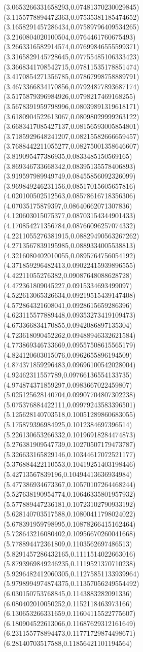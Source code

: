 {(3.0653266331658293,0.07481370230029845)
(3.1155778894472363,0.07535381185474652)
(3.1658291457286434,0.07589796409534265)
(3.2160804020100504,0.0764461760675493)
(3.2663316582914574,0.07699846555599371)
(3.3165829145728645,0.07755485106333423)
(3.3668341708542715,0.07811535178851474)
(3.4170854271356785,0.07867998758889791)
(3.4673366834170856,0.07924877893687174)
(3.5175879396984926,0.0798217469168255)
(3.5678391959798996,0.08039891319618171)
(3.6180904522613067,0.08098029999263122)
(3.6683417085427137,0.08156593005854801)
(3.7185929648241207,0.08215582666659457)
(3.7688442211055277,0.08275001358646607)
(3.819095477386935,0.0833485150569165)
(3.869346733668342,0.08395135578406893)
(3.919597989949749,0.08455856092326099)
(3.969849246231156,0.08517015605657816)
(4.020100502512563,0.08578616718356306)
(4.07035175879397,0.08640662071307836)
(4.120603015075377,0.08703154344901433)
(4.170854271356784,0.08766096257074332)
(4.2211055276381915,0.08829490563267262)
(4.2713567839195985,0.0889334005538813)
(4.3216080402010055,0.0895764756054192)
(4.371859296482413,0.09022415939896555)
(4.42211055276382,0.09087648088628728)
(4.472361809045227,0.0915334693499097)
(4.522613065326634,0.09219515439147408)
(4.572864321608041,0.0928615659286396)
(4.623115577889448,0.09353273419109473)
(4.673366834170855,0.0942086897135304)
(4.723618090452262,0.09488946332621584)
(4.773869346733669,0.09557508615565179)
(4.824120603015076,0.0962655896194509)
(4.874371859296483,0.09696100542028004)
(4.92462311557789,0.09766136554133735)
(4.974874371859297,0.0983667022459807)
(5.025125628140704,0.09907704807302238)
(5.075376884422111,0.09979243583396501)
(5.125628140703518,0.10051289860683055)
(5.175879396984925,0.1012384697396514)
(5.226130653266332,0.10196918284474873)
(5.276381909547739,0.10270507179473787)
(5.326633165829146,0.10344617072521177)
(5.376884422110553,0.10419251403198446)
(5.42713567839196,0.10494413636934984)
(5.477386934673367,0.10570107264468244)
(5.527638190954774,0.10646335801957932)
(5.577889447236181,0.10723102790933192)
(5.628140703517588,0.10800411798024022)
(5.678391959798995,0.10878266415162464)
(5.728643216080402,0.10956670260041668)
(5.778894472361809,0.1103562697486513)
(5.8291457286432165,0.1111514022663016)
(5.8793969849246235,0.1119521370710238)
(5.9296482412060305,0.11275851133939964)
(5.9798994974874375,0.11357056249554492)
(6.030150753768845,0.1143883282091336)
(6.080402010050252,0.1152118463973166)
(6.130653266331659,0.11604115522775607)
(6.180904522613066,0.11687629312161649)
(6.231155778894473,0.11771729874498671)
(6.28140703517588,0.11856421101194564)
}

